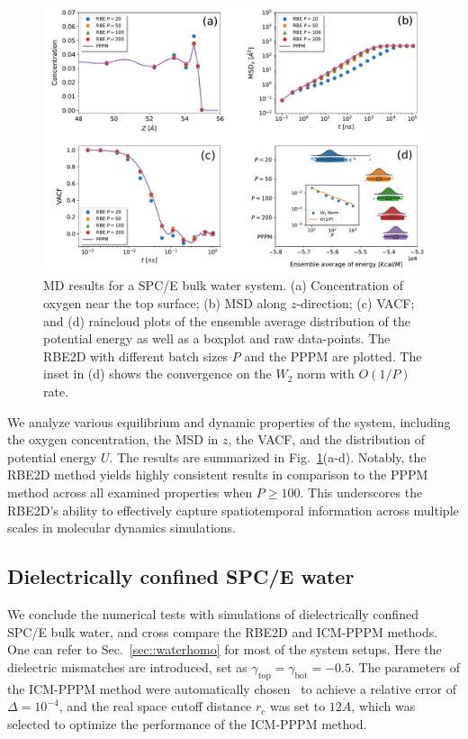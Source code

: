 \begin{figure}[ht!]
\centering
\includegraphics[width=1.0\linewidth]{figs/Density_new.pdf}
	\caption{MD results for a SPC/E bulk water system. (a)  Concentration of oxygen near the top surface; (b)  MSD along $z$-direction; (c)  VACF; and (d)  raincloud plots of the ensemble average distribution of the potential energy as well as a boxplot and raw data-points. The RBE2D with different batch sizes $P$ and the PPPM are plotted. The inset in (d) shows the convergence on the $W_2$ norm with $O(1/P)$ rate.}
	\label{fig:Water}
\end{figure}

We analyze various equilibrium and dynamic properties of the system, including the oxygen concentration, the MSD in $z$, the VACF, and the distribution of potential energy $U$.
The results are summarized in Fig.~\ref{fig:Water}(a-d).
Notably, the RBE2D method yields highly consistent results in comparison to the PPPM method across all examined properties when $P \geq 100$. 
This underscores the RBE2D's ability to effectively capture spatiotemporal information across multiple scales in molecular dynamics simulations.

\subsection{Dielectrically confined SPC/E water}

We conclude the numerical tests with simulations of dielectrically confined SPC/E bulk water, and cross compare the RBE2D and ICM-PPPM methods. 
One can refer to Sec.~\ref{sec::waterhomo} for most of the system setups.
Here the dielectric mismatches are introduced, set as $\gamma_{\text{top}}=\gamma_{\text{bot}}=-0.5$. 
The parameters of the ICM-PPPM method were automatically chosen~\cite{kolafa1992cutoff} to achieve a relative error of $\Delta=10^{-4}$, and the real space cutoff distance $r_c$ was set to $12\mathring{A}$, which was selected to optimize the performance of the ICM-PPPM method. 

